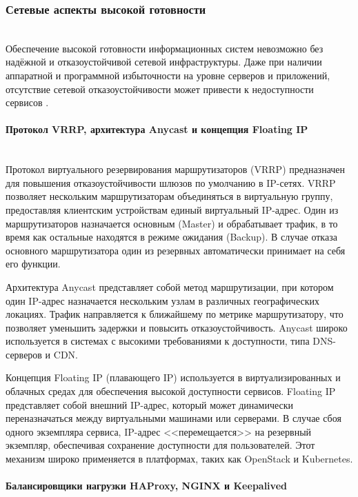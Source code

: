 \subsubsection{Сетевые аспекты высокой готовности}  ~\\

Обеспечение высокой готовности информационных систем невозможно без надёжной и отказоустойчивой сетевой инфраструктуры. Даже при наличии аппаратной и программной избыточности на уровне серверов и приложений, отсутствие сетевой отказоустойчивости может привести к недоступности сервисов \autocite{NginxDocs1}.

\paragraph{Протокол VRRP, архитектура Anycast и концепция Floating IP} ~\\

Протокол виртуального резервирования маршрутизаторов (VRRP) предназначен для повышения отказоустойчивости шлюзов по умолчанию в IP-сетях. VRRP позволяет нескольким маршрутизаторам объединяться в виртуальную группу, предоставляя клиентским устройствам единый виртуальный IP-адрес. Один из маршрутизаторов назначается основным (Master) и обрабатывает трафик, в то время как остальные находятся в режиме ожидания (Backup). В случае отказа основного маршрутизатора один из резервных автоматически принимает на себя его функции.

Архитектура Anycast представляет собой метод маршрутизации, при котором один IP-адрес назначается нескольким узлам в различных географических локациях. Трафик направляется к ближайшему по метрике маршрутизатору, что позволяет уменьшить задержки и повысить отказоустойчивость. Anycast широко используется в системах с высокими требованиями к доступности, типа DNS-серверов и CDN.

Концепция Floating IP (плавающего IP) используется в виртуализированных и облачных средах для обеспечения высокой доступности сервисов. Floating IP представляет собой внешний IP-адрес, который может динамически переназначаться между виртуальными машинами или серверами. В случае сбоя одного экземпляра сервиса, IP-адрес <<перемещается>> на резервный экземпляр, обеспечивая сохранение доступности для пользователей. Этот механизм широко применяется в платформах, таких как OpenStack и Kubernetes.

\paragraph{Балансировщики нагрузки HAProxy, NGINX и Keepalived} ~\\

